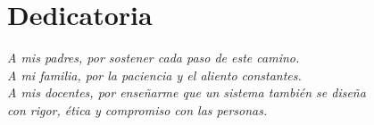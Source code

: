 \chapter*{Dedicatoria}
\thispagestyle{plain}

\vspace*{4cm}

\begin{flushright}
\itshape
A mis padres, por sostener cada paso de este camino.\\
A mi familia, por la paciencia y el aliento constantes.\\
A mis docentes, por enseñarme que un sistema también se diseña\\
con rigor, ética y compromiso con las personas.
\end{flushright}

